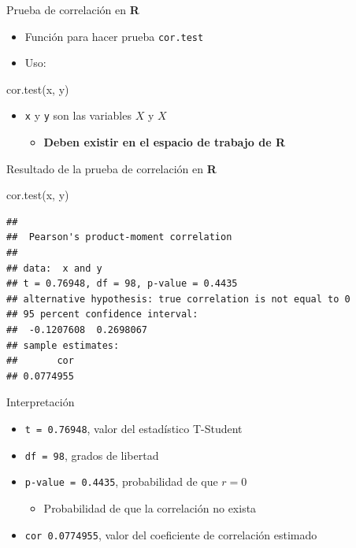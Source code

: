 \documentclass[
  11pt,
  ignorenonframetext,
]{beamer}
\newenvironment{Shaded}{}{}
\newcommand{\FunctionTok}[1]{\textcolor[rgb]{0.02,0.16,0.49}{#1}}
\newcommand{\NormalTok}[1]{#1}
\providecommand{\tightlist}{%
  \setlength{\itemsep}{0pt}\setlength{\parskip}{0pt}}
\begin{document}
\begin{frame}[fragile]{Prueba de correlación en \textbf{R}}
\protect\hypertarget{prueba-de-correlaciuxf3n-en-r}{}
\begin{itemize}
\item
  Función para hacer prueba \texttt{cor.test}
\item
  Uso:
\end{itemize}

\begin{Shaded}
\begin{Highlighting}[]
\FunctionTok{cor.test}\NormalTok{(x, y)}
\end{Highlighting}
\end{Shaded}

\begin{itemize}
\item
  \texttt{x} y \texttt{y} son las variables \(X\) y \(X\)

  \begin{itemize}
  \tightlist
  \item
    \textbf{Deben existir en el espacio de trabajo de R}
  \end{itemize}
\end{itemize}
\end{frame}

\begin{frame}[fragile]{Resultado de la prueba de correlación en
\textbf{R}}
\protect\hypertarget{resultado-de-la-prueba-de-correlaciuxf3n-en-r}{}
\begin{Shaded}
\begin{Highlighting}[]
\FunctionTok{cor.test}\NormalTok{(x, y)}
\end{Highlighting}
\end{Shaded}

\begin{verbatim}
## 
##  Pearson's product-moment correlation
## 
## data:  x and y
## t = 0.76948, df = 98, p-value = 0.4435
## alternative hypothesis: true correlation is not equal to 0
## 95 percent confidence interval:
##  -0.1207608  0.2698067
## sample estimates:
##       cor 
## 0.0774955
\end{verbatim}
\end{frame}

\begin{frame}[fragile]{Interpretación}
\protect\hypertarget{interpretaciuxf3n}{}
\begin{itemize}
\item
  \texttt{t\ =\ 0.76948}, valor del estadístico T-Student
\item
  \texttt{df\ =\ 98}, grados de libertad
\item
  \texttt{p-value\ =\ 0.4435}, probabilidad de que \(r = 0\)

  \begin{itemize}
  \tightlist
  \item
    Probabilidad de que la correlación no exista
  \end{itemize}
\item
  \texttt{cor\ 0.0774955}, valor del coeficiente de correlación estimado
\end{itemize}
\end{frame}
\end{document}
